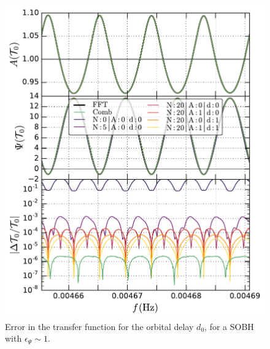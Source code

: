 \documentclass[aps,showpacs,twocolumn,
prd,superscriptaddress,nofootinbib]{revtex4-1}
\begin{document}
\begin{figure}
  \centering
  \includegraphics[width=.98\linewidth]{plots/LISAtransfererrorSOBHepsPsi1d0corr_py.pdf}
  \caption{Error in the transfer function for the orbital delay $d_{0}$, for a SOBH with $\epsilon_{\Psi}\sim 1$.}
  \label{fig:}
\end{figure}
\end{document}
